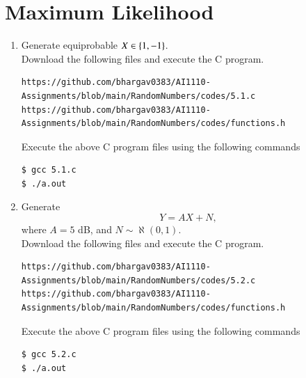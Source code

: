 \documentclass[journal,12pt,twocolumn]{IEEEtran}
\renewcommand\thesection{\arabic{section}}
\begin{document}
\section{Maximum Likelihood}
\begin{enumerate}[label=\thesection.\arabic*
,ref=\thesection.\theenumi]
\item Generate equiprobable $X \in \left\{1,-1\right\}$.\\
\solution
Download the following files and execute the  C program.
\begin{lstlisting}
https://github.com/bhargav0383/AI1110-Assignments/blob/main/RandomNumbers/codes/5.1.c
https://github.com/bhargav0383/AI1110-Assignments/blob/main/RandomNumbers/codes/functions.h
\end{lstlisting}
Execute the above C program files using the following commands
\begin{lstlisting}
$ gcc 5.1.c
$ ./a.out
\end{lstlisting}


\item Generate 
\begin{equation}
Y = AX+N,
\end{equation}
		where $A = 5$ dB,  and $N \sim \aleph(0,1)$.\\
\solution
Download the following files and execute the  C program.
\begin{lstlisting}
https://github.com/bhargav0383/AI1110-Assignments/blob/main/RandomNumbers/codes/5.2.c
https://github.com/bhargav0383/AI1110-Assignments/blob/main/RandomNumbers/codes/functions.h
\end{lstlisting}
Execute the above C program files using the following commands
\begin{lstlisting}
$ gcc 5.2.c
$ ./a.out
\end{lstlisting}


\end{enumerate}
\end{document}
